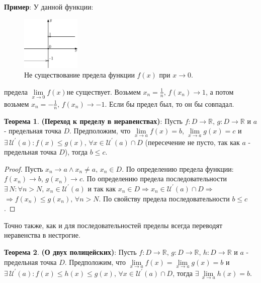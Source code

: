 \documentclass[12pt]{article}
\theoremstyle{definition}
\newtheorem{theorem}{Теорема}
\begin{document}
\textbf{Пример}: У данной функции:
\begin{figure}[H]
	\centering
	\includegraphics[width=0.25\textwidth]{14_8.eps}
	\caption{Не существование предела функции $f(x)$ при $x \to 0$.}
	\label{14_8}
\end{figure}
предела $ \lim\limits_{x \to 0} f(x)$не существует. Возьмем $x_n = \frac{1}{n}, \, f(x_n) \to 1$, а потом возьмем $x_n = -\frac{1}{n}, \, f(x_n) \to -1$. Если бы предел был, то он бы совпадал.

\begin{theorem}\textbf{(Переход к пределу в неравенствах)}:
	Пусть $f\colon D \to \mathbb{R}, \, g\colon D \to \mathbb{R}$ и $a$ - предельная точка $D$.  Предположим, что $\lim\limits_{x \to a}f(x) = b$, $\lim\limits_{x\to a}g(x) = c$ и $\exists \, \mathcal{U}^\prime(a) \colon f(x) \leq g(x), \, \forall x \in \mathcal{U}^\prime(a) \cap D$ (пересечение не пусто, так как $a$ - предельная точка $D$), тогда $b \leq c$.
\end{theorem}

\begin{proof}
	Пусть $x_n \to a \wedge x_n \neq a, \, x_n \in D$. По определению предела функции: $f(x_n) \to b$, $g(x_n) \to c$. По определению предела последовательности $\exists \, N \colon \forall n > N, \, x_n \in \mathcal{U}^\prime(a)$ и так как $x_n \in D \Rightarrow x_n \in \mathcal{U}^\prime(a) \cap D \Rightarrow$\\
	$\Rightarrow f(x_n) \leq g(x_n), \, \forall n>N$. По свойству предела последовательности $b \leq c$.
\end{proof}

Точно также, как и для последовательностей пределы всегда переводят неравенства в нестрогие. 

\begin{theorem}\textbf{(О двух полицейских)}:
	Пусть $f\colon D \to \mathbb{R}, \, g\colon D \to \mathbb{R}, \, h\colon D \to \mathbb{R}$ и $a$ - предельная точка $D$. Предположим, что $\lim\limits_{x \to a}f(x) = \lim\limits_{x\to a}g(x) = b$ и $\exists \, \mathcal{U}^\prime(a) \colon f(x) \leq h(x) \leq g(x), \, \forall x \in \mathcal{U}^\prime(a) \cap D$, тогда $\exists \, \lim\limits_{x \to a} h(x) = b$.
\end{theorem}
\end{document}
